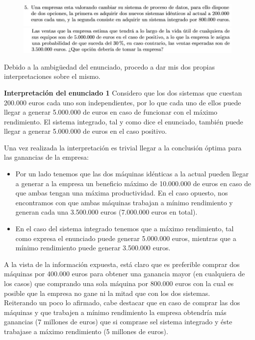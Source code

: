 \begin{figure}[H]
	\includegraphics[scale=0.65]{imagenes/51} 
	\includegraphics[scale=0.65]{imagenes/52} 
\end{figure}

Debido a la ambigüedad del enunciado, procedo a dar mis dos propias interpretaciones sobre el mismo.

\textbf{Interpretación del enunciado 1}
Considero que los dos sistemas que cuestan 200.000 euros cada uno son independientes, por lo que cada uno de ellos puede llegar a generar 5.000.000 de euros en caso de funcionar con el máximo rendimiento. El sistema integrado, tal y como dice el enunciado, también puede llegar a generar 5.000.000 de euros en el caso positivo.

Una vez realizada la interpretación es trivial llegar a la conclusión óptima para las ganancias de la empresa:

\begin{itemize}
	\item Por un lado tenemos que las dos máquinas idénticas a la actual pueden llegar a generar a la empresa un beneficio máximo de 10.000.000 de euros en caso de que ambas tengan una máxima productividad. En el caso opuesto, nos encontramos con que ambas máquinas trabajan a mínimo rendimiento y generan cada una 3.500.000 euros (7.000.000 euros en total).
	\item En el caso del sistema integrado tenemos que a máximo rendimiento, tal como expresa el enunciado puede generar 5.000.000 euros, mientras que a mínimo rendimiento puede generar 3.500.000 euros.
\end{itemize}

A la vista de la información expuesta, está claro que es preferible comprar dos máquinas por 400.000 euros para obtener una ganancia mayor (en cualquiera de los casos) que comprando una sola máquina por 800.000 euros con la cual es posible que la empresa no gane ni la mitad que con los dos sistemas.\\
Reiterando un poco lo afirmado, cabe destacar que en caso de comprar las dos máquinas y que trabajen a mínimo rendimiento la empresa obtendría más ganancias (7 millones de euros) que si comprase sel sistema integrado y éste trabajase a máximo rendimiento (5 millones de euros).\\


